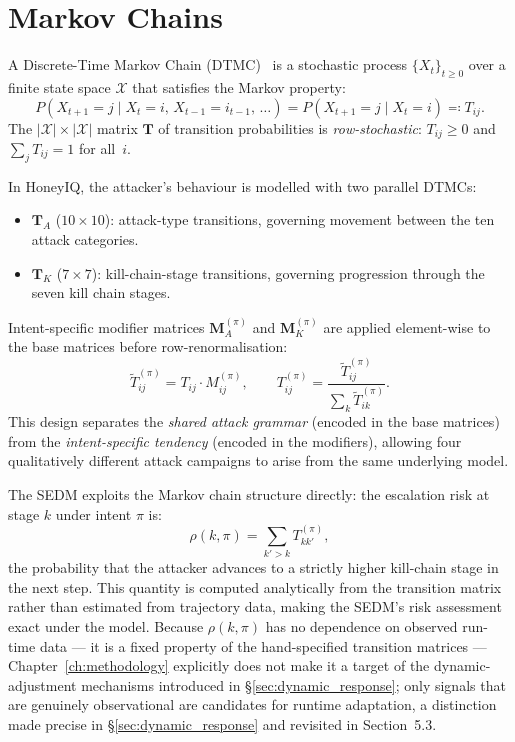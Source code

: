 \section{Markov Chains}
\label{sec:bg_markov}

A Discrete-Time Markov Chain (DTMC)~\citep{norris1998markov} is a stochastic
process $\{X_t\}_{t \geq 0}$ over a finite state space $\mathcal{X}$ that
satisfies the Markov property:
%
\begin{equation}
  P(X_{t+1} = j \mid X_t = i,\, X_{t-1} = i_{t-1},\, \ldots)
  = P(X_{t+1} = j \mid X_t = i) \eqqcolon T_{ij}.
\end{equation}
%
The $|\mathcal{X}| \times |\mathcal{X}|$ matrix $\mathbf{T}$ of transition
probabilities is \emph{row-stochastic}: $T_{ij} \geq 0$ and
$\sum_j T_{ij} = 1$ for all~$i$.

In HoneyIQ, the attacker's behaviour is modelled with two parallel DTMCs:
%
\begin{itemize}
  \item $\mathbf{T}_A$ ($10 \times 10$): attack-type transitions, governing
        movement between the ten attack categories.
  \item $\mathbf{T}_K$ ($7 \times 7$): kill-chain-stage transitions,
        governing progression through the seven kill chain stages.
\end{itemize}

Intent-specific modifier matrices $\mathbf{M}_A^{(\pi)}$ and
$\mathbf{M}_K^{(\pi)}$ are applied element-wise to the base matrices before
row-renormalisation:
%
\begin{equation}
  \tilde{T}^{(\pi)}_{ij} = T_{ij} \cdot M^{(\pi)}_{ij}, \qquad
  T^{(\pi)}_{ij} = \frac{\tilde{T}^{(\pi)}_{ij}}{\sum_k \tilde{T}^{(\pi)}_{ik}}.
\end{equation}
%
This design separates the \emph{shared attack grammar} (encoded in the base
matrices) from the \emph{intent-specific tendency} (encoded in the modifiers),
allowing four qualitatively different attack campaigns to arise from the
same underlying model.

The SEDM exploits the Markov chain structure directly: the escalation risk
at stage $k$ under intent $\pi$ is:
%
\begin{equation}
  \rho(k, \pi) = \sum_{k' > k} T^{(\pi)}_{kk'},
  \label{eq:esc_risk}
\end{equation}
%
the probability that the attacker advances to a strictly higher kill-chain
stage in the next step.
This quantity is computed analytically from the transition matrix rather than
estimated from trajectory data, making the SEDM's risk assessment exact under
the model.
Because $\rho(k, \pi)$ has no dependence on observed run-time data --- it is
a fixed property of the hand-specified transition matrices --- Chapter~\ref{ch:methodology}
explicitly does not make it a target of the dynamic-adjustment mechanisms
introduced in \S\ref{sec:dynamic_response}; only signals that are genuinely
observational are candidates for runtime adaptation, a distinction made
precise in \S\ref{sec:dynamic_response} and revisited in Section~5.3.

